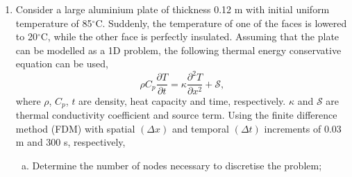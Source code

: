 \documentclass[calculator,datasheet,handbook,solutions]{exam}
\begin{document}

\begin{question}
  \begin{enumerate}
    \item Consider a large aluminium plate of thickness 0.12 m with initial uniform temperature of 85$^{\circ}$C. Suddenly, the temperature of one of the faces is lowered to 20$^{\circ}$C, while the other face is perfectly insulated. Assuming that the plate can be modelled as a 1D problem, the following thermal energy conservative equation can be used,
    \begin{displaymath}
      \rho C_{p}\frac{\partial T}{\partial t} = \kappa \frac{\partial^{2} T}{\partial x^{2}} + \mathcal{S},
    \end{displaymath}
    where $\rho$, $C_{p}$, $t$ are density, heat capacity and time, respectively. $\kappa$ and $\mathcal{S}$ are thermal conductivity coefficient and source term.  Using the finite difference method (FDM) with spatial $\left(\Delta  x\right)$ and temporal $\left(\Delta t\right)$ increments of 0.03 m and 300 s, respectively, 
  \begin{enumerate}[a)]
     \item Determine the number of nodes necessary to discretise the problem;~
\end{enumerate}
\end{enumerate}
\end{question}
\end{document}
